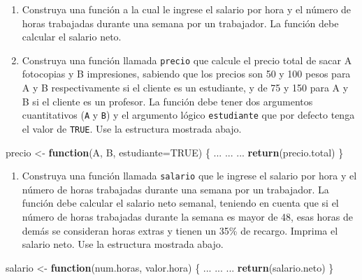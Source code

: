 \documentclass[10pt,]{krantz}
\makeatletter
\newenvironment{Shaded}{\begin{snugshade}}{\end{snugshade}}
\newcommand{\KeywordTok}[1]{\textcolor[rgb]{0.13,0.29,0.53}{\textbf{#1}}}
\newcommand{\DataTypeTok}[1]{\textcolor[rgb]{0.13,0.29,0.53}{#1}}
\newcommand{\StringTok}[1]{\textcolor[rgb]{0.31,0.60,0.02}{#1}}
\newcommand{\OtherTok}[1]{\textcolor[rgb]{0.56,0.35,0.01}{#1}}
\newcommand{\ControlFlowTok}[1]{\textcolor[rgb]{0.13,0.29,0.53}{\textbf{#1}}}
\newcommand{\NormalTok}[1]{#1}
\providecommand{\tightlist}{%
  \setlength{\itemsep}{0pt}\setlength{\parskip}{0pt}}
\newenvironment{kframe}{%
\medskip{}
\setlength{\fboxsep}{.8em}
 \def\at@end@of@kframe{}%
 \ifinner\ifhmode%
  \def\at@end@of@kframe{\end{minipage}}%
  \begin{minipage}{\columnwidth}%
 \fi\fi%
 \def\FrameCommand##1{\hskip\@totalleftmargin \hskip-\fboxsep
 \colorbox{shadecolor}{##1}\hskip-\fboxsep
     \hskip-\linewidth \hskip-\@totalleftmargin \hskip\columnwidth}%
 \MakeFramed {\advance\hsize-\width
   \@totalleftmargin\z@ \linewidth\hsize
   \@setminipage}}%
 {\par\unskip\endMakeFramed%
 \at@end@of@kframe}
\renewenvironment{Shaded}{\begin{kframe}}{\end{kframe}}
\makeatother
\begin{document}
\begin{enumerate}
\def\labelenumi{\arabic{enumi}.}
\setcounter{enumi}{5}
\item
  Construya una función a la cual le ingrese el salario por hora y el
  número de horas trabajadas durante una semana por un trabajador. La
  función debe calcular el salario neto.
\item
  Construya una función llamada \texttt{precio} que calcule el precio
  total de sacar A fotocopias y B impresiones, sabiendo que los precios
  son 50 y 100 pesos para A y B respectivamente si el cliente es un
  estudiante, y de 75 y 150 para A y B si el cliente es un profesor. La
  función debe tener dos argumentos cuantitativos (\texttt{A} y
  \texttt{B}) y el argumento lógico \texttt{estudiante} que por defecto
  tenga el valor de \texttt{TRUE}. Use la estructura mostrada abajo.
\end{enumerate}

\begin{Shaded}
\begin{Highlighting}[]
\NormalTok{precio <-}\StringTok{ }\ControlFlowTok{function}\NormalTok{(A, B, }\DataTypeTok{estudiante=}\OtherTok{TRUE}\NormalTok{) \{}
\NormalTok{  ...}
\NormalTok{  ...}
\NormalTok{  ...}
  \KeywordTok{return}\NormalTok{(precio.total)}
\NormalTok{\}}
\end{Highlighting}
\end{Shaded}

\begin{enumerate}
\def\labelenumi{\arabic{enumi}.}
\setcounter{enumi}{7}
\tightlist
\item
  Construya una función llamada \texttt{salario} que le ingrese el
  salario por hora y el número de horas trabajadas durante una semana
  por un trabajador. La función debe calcular el salario neto semanal,
  teniendo en cuenta que si el número de horas trabajadas durante la
  semana es mayor de 48, esas horas de demás se consideran horas extras
  y tienen un 35\% de recargo. Imprima el salario neto. Use la
  estructura mostrada abajo.
\end{enumerate}

\begin{Shaded}
\begin{Highlighting}[]
\NormalTok{salario <-}\StringTok{ }\ControlFlowTok{function}\NormalTok{(num.horas, valor.hora) \{}
\NormalTok{  ...}
\NormalTok{  ...}
\NormalTok{  ...}
  \KeywordTok{return}\NormalTok{(salario.neto)}
\NormalTok{\}}
\end{Highlighting}
\end{Shaded}
\end{document}
